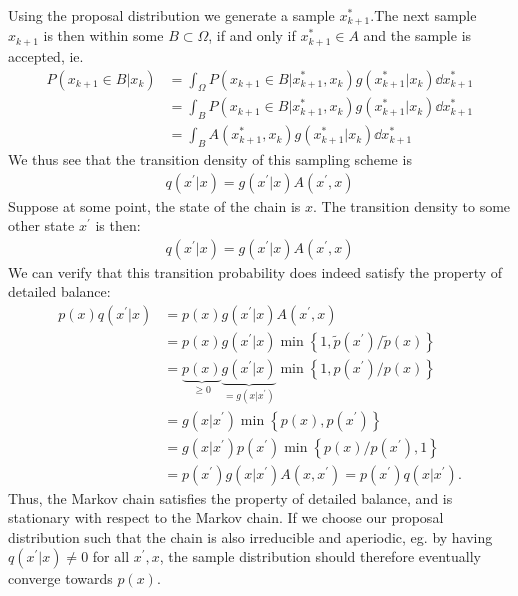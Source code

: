 Using the proposal distribution we generate a sample $x^\ast_{k+1}$.The next sample $x_{k+1}$ is then within some $B\subset \Omega$, if and only if $x^\ast_{k+1}\in A$ and the sample is accepted, ie.
\begin{equation}
    \begin{aligned}
        P(x_{k+1} \in B | x_k ) 
        &= \int_\Omega P( x_{k+1} \in B | x^\ast_{k+1},x_k) g(x^\ast_{k+1}|x_k) \dd{x^\ast_{k+1}}\\
        &= \int_B P( x_{k+1} \in B | x^\ast_{k+1},x_k) g(x^\ast_{k+1}|x_k) \dd{x^\ast_{k+1}} \\
        &= \int_B A(x^\ast_{k+1}, x_k) g(x^\ast_{k+1}|x_k) \dd{x^\ast_{k+1}}
    \end{aligned}
\end{equation}
We thus see that the transition density of this sampling scheme is
\begin{align}
    q(x^\prime|x) = g(x^\prime | x) A(x^\prime, x)
\end{align} 
Suppose at some point, the state of the chain is $x$. The transition density to some other state $x^\prime$ is then:
\begin{align*}
    q(x^\prime|x) = g(x^\prime | x) A(x^\prime, x)
\end{align*}
We can verify that this transition probability does indeed satisfy the property of detailed balance:
\begin{align*}
    p(x)q(x^\prime|x) &= p(x)g(x^\prime | x) A(x^\prime, x) \\
                      &= p(x)g(x^\prime | x) \min\left\{1,  \tilde{p}(x^\prime) / \tilde{p}(x)\right\} \\
                      &= \underbrace{p(x)}_{\geq 0} \underbrace{g(x^\prime | x)}_{=g(x | x^\prime)} \min\left\{1,  p(x^\prime) / p(x)\right\} \\
                      &= g(x | x^\prime) \min\left\{p(x), p(x^\prime)\right\} \\
                      &= g(x | x^\prime) p(x^\prime) \min\left\{p(x)/p(x^\prime), 1\right\} \\
                      &= p(x^\prime) g(x | x^\prime)  A(x ,x^\prime) = p(x^\prime) q(x|x^\prime).
\end{align*}
Thus, the Markov chain satisfies the property of detailed balance, and is stationary with respect to the Markov chain. If we choose our proposal distribution such that the chain is also irreducible and aperiodic, eg. by having $q(x^\prime|x) \neq 0$ for all $x^\prime,x$, the sample distribution should therefore eventually converge towards $p(x)$. 

